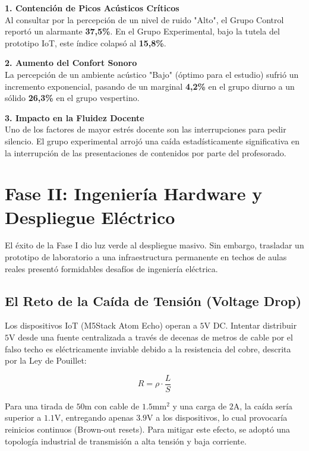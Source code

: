 \documentclass[11pt,a4paper]{article}
\begin{document}
\begin{InfoBox}
\textbf{1. Contención de Picos Acústicos Críticos}\\
Al consultar por la percepción de un nivel de ruido "Alto", el Grupo Control reportó un alarmante \textbf{37,5\%}. En el Grupo Experimental, bajo la tutela del prototipo IoT, este índice colapsó al \textbf{15,8\%}. 

\textbf{2. Aumento del Confort Sonoro}\\
La percepción de un ambiente acústico "Bajo" (óptimo para el estudio) sufrió un incremento exponencial, pasando de un marginal \textbf{4,2\%} en el grupo diurno a un sólido \textbf{26,3\%} en el grupo vespertino.

\textbf{3. Impacto en la Fluidez Docente}\\
Uno de los factores de mayor estrés docente son las interrupciones para pedir silencio. El grupo experimental arrojó una caída estadísticamente significativa en la interrupción de las presentaciones de contenidos por parte del profesorado.
\end{InfoBox}

\section{Fase II: Ingeniería Hardware y Despliegue Eléctrico}

El éxito de la Fase I dio luz verde al despliegue masivo. Sin embargo, trasladar un prototipo de laboratorio a una infraestructura permanente en techos de aulas reales presentó formidables desafíos de ingeniería eléctrica.

\subsection{El Reto de la Caída de Tensión (Voltage Drop)}
Los dispositivos IoT (M5Stack Atom Echo) operan a $5\text{V DC}$. Intentar distribuir $5\text{V}$ desde una fuente centralizada a través de decenas de metros de cable por el falso techo es eléctricamente inviable debido a la resistencia del cobre, descrita por la Ley de Pouillet:

$$ R = \rho \cdot \frac{L}{S} $$

Para una tirada de $50\text{m}$ con cable de $1.5\text{mm}^2$ y una carga de $2\text{A}$, la caída sería superior a $1.1\text{V}$, entregando apenas $3.9\text{V}$ a los dispositivos, lo cual provocaría reinicios continuos (Brown-out resets). Para mitigar este efecto, se adoptó una topología industrial de transmisión a alta tensión y baja corriente.
\end{document}
